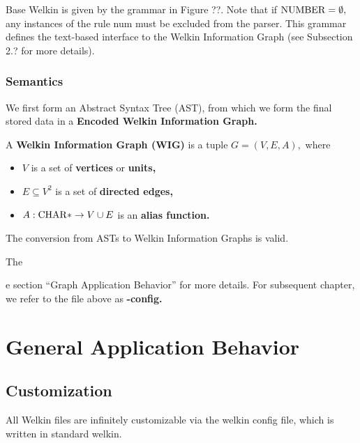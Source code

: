 Base Welkin is given by the grammar in Figure ??. Note that if $\mathrm{NUMBER}= \emptyset,$ any instances of the rule num must be excluded from the parser. This grammar defines the text-based interface to the Welkin Information Graph (see Subsection 2.? for more details).

\subsubsection*{Semantics}
We first form an Abstract Syntax Tree (AST), from which we form the final stored data in a \textbf{Encoded Welkin Information Graph.}
\begin{definition}
	A \textbf{Welkin Information Graph (WIG)} is a tuple $G = (V, E, A),$ where
	\begin{itemize}
		\item $V$ is a set of \textbf{vertices} or \textbf{units,}
		\item $E \subseteq V^{2} $ is a set of \textbf{directed edges,}
		\item $A: \mathrm{CHAR}* \to V \cup E$ is an \textbf{alias function.}
	\end{itemize}
\end{definition}

\begin{lemma}
The conversion from ASTs to Welkin Information Graphs is valid.
\end{lemma}


The

e section ``Graph Application Behavior'' for more details. For subsequent chapter, we refer to the file above as \textbf{-config.}


\section{General Application Behavior}


\subsection{Customization}
All Welkin files are infinitely customizable via the welkin config file, which is written in standard welkin.

